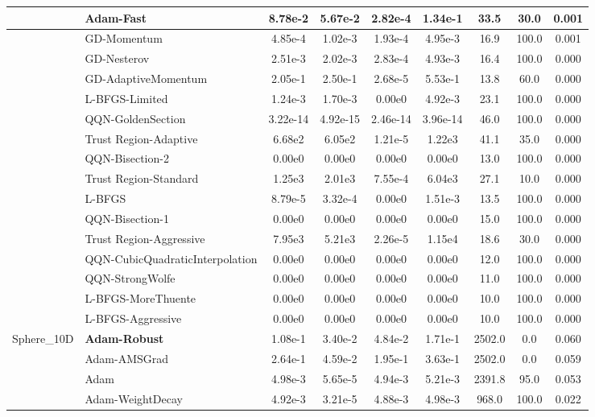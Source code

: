 \documentclass[10pt]{article}
\begin{document}
\begin{longtable}{|l|l|c|c|c|c|c|c|c|}
\hline
 & Adam-Fast & 8.78e-2 & 5.67e-2 & 2.82e-4 & 1.34e-1 & 33.5 & 30.0 & 0.001 \\
\hline
 & GD-Momentum & 4.85e-4 & 1.02e-3 & 1.93e-4 & 4.95e-3 & 16.9 & 100.0 & 0.001 \\
\hline
 & GD-Nesterov & 2.51e-3 & 2.02e-3 & 2.83e-4 & 4.93e-3 & 16.4 & 100.0 & 0.000 \\
\hline
 & GD-AdaptiveMomentum & 2.05e-1 & 2.50e-1 & 2.68e-5 & 5.53e-1 & 13.8 & 60.0 & 0.000 \\
\hline
 & L-BFGS-Limited & 1.24e-3 & 1.70e-3 & 0.00e0 & 4.92e-3 & 23.1 & 100.0 & 0.000 \\
\hline
 & QQN-GoldenSection & 3.22e-14 & 4.92e-15 & 2.46e-14 & 3.96e-14 & 46.0 & 100.0 & 0.000 \\
\hline
 & Trust Region-Adaptive & 6.68e2 & 6.05e2 & 1.21e-5 & 1.22e3 & 41.1 & 35.0 & 0.000 \\
\hline
 & QQN-Bisection-2 & 0.00e0 & 0.00e0 & 0.00e0 & 0.00e0 & 13.0 & 100.0 & 0.000 \\
\hline
 & Trust Region-Standard & 1.25e3 & 2.01e3 & 7.55e-4 & 6.04e3 & 27.1 & 10.0 & 0.000 \\
\hline
 & L-BFGS & 8.79e-5 & 3.32e-4 & 0.00e0 & 1.51e-3 & 13.5 & 100.0 & 0.000 \\
\hline
 & QQN-Bisection-1 & 0.00e0 & 0.00e0 & 0.00e0 & 0.00e0 & 15.0 & 100.0 & 0.000 \\
\hline
 & Trust Region-Aggressive & 7.95e3 & 5.21e3 & 2.26e-5 & 1.15e4 & 18.6 & 30.0 & 0.000 \\
\hline
 & QQN-CubicQuadraticInterpolation & 0.00e0 & 0.00e0 & 0.00e0 & 0.00e0 & 12.0 & 100.0 & 0.000 \\
\hline
 & QQN-StrongWolfe & 0.00e0 & 0.00e0 & 0.00e0 & 0.00e0 & 11.0 & 100.0 & 0.000 \\
\hline
 & L-BFGS-MoreThuente & 0.00e0 & 0.00e0 & 0.00e0 & 0.00e0 & 10.0 & 100.0 & 0.000 \\
\hline
 & L-BFGS-Aggressive & 0.00e0 & 0.00e0 & 0.00e0 & 0.00e0 & 10.0 & 100.0 & 0.000 \\
Sphere\_10D & \textbf{Adam-Robust} & 1.08e-1 & 3.40e-2 & 4.84e-2 & 1.71e-1 & 2502.0 & 0.0 & 0.060 \\
\hline
 & Adam-AMSGrad & 2.64e-1 & 4.59e-2 & 1.95e-1 & 3.63e-1 & 2502.0 & 0.0 & 0.059 \\
\hline
 & Adam & 4.98e-3 & 5.65e-5 & 4.94e-3 & 5.21e-3 & 2391.8 & 95.0 & 0.053 \\
\hline
 & Adam-WeightDecay & 4.92e-3 & 3.21e-5 & 4.88e-3 & 4.98e-3 & 968.0 & 100.0 & 0.022 \\

\end{longtable}
\end{document}
